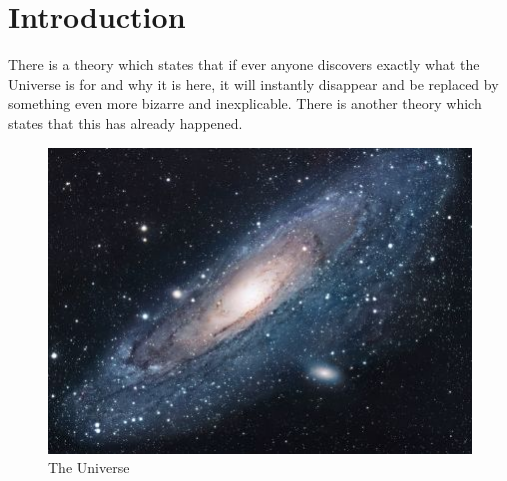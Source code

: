 

\chapter{Introduction}
There is a theory which states that if ever anyone discovers exactly what the Universe is for and why it is here, it will instantly disappear and be replaced by something even more bizarre and inexplicable.
There is another theory which states that this has already happened. \cite{lauesen2001software}

\begin{figure}[h!]
\centering
\includegraphics[scale=1.7]{img/universe}
\caption{The Universe}
\label{fig:universe}
\end{figure}
